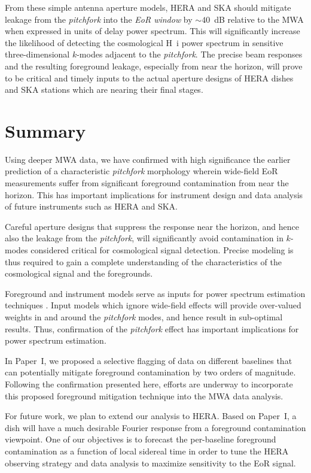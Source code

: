 \documentclass[preprint2,apjl,numberedappendix,twocolappendix,appendixfloats]{emulateapj}
\begin{document}
From these simple antenna aperture models, HERA and SKA should mitigate leakage from the {\it pitchfork} into the {\it EoR window} by $\sim 40$~dB relative to the MWA when expressed in units of delay power spectrum. This will significantly increase the likelihood of detecting the cosmological H~{\sc i} power spectrum in sensitive three-dimensional $k$-modes adjacent to the {\it pitchfork}. The precise beam responses and the resulting foreground leakage, especially from near the horizon, will prove to be critical and timely inputs to the actual aperture designs of HERA dishes and SKA stations which are nearing their final stages.

\section{Summary}\label{sec:summary}

Using deeper MWA data, we have confirmed with high significance the earlier prediction of a characteristic {\it pitchfork} morphology wherein wide-field EoR measurements suffer from significant foreground contamination from near the horizon. This has important implications for instrument design and data analysis of future instruments such as HERA and SKA. 

Careful aperture designs that suppress the response near the horizon, and hence also the leakage from the {\it pitchfork}, will significantly avoid contamination in $k$-modes considered critical for cosmological signal detection. Precise modeling is thus required to gain a complete understanding of the characteristics of the cosmological signal and the foregrounds. 

Foreground and instrument models serve as inputs for power spectrum estimation techniques \citep[for e.g.,][]{liu14a,liu14b,dil15}. Input models which ignore wide-field effects will provide over-valued weights in and around the {\it pitchfork} modes, and hence result in sub-optimal results. Thus, confirmation of the {\it pitchfork} effect has important implications for power spectrum estimation. 

In Paper~I, we proposed a selective flagging of data on different baselines that can potentially mitigate foreground contamination by two orders of magnitude. Following the confirmation presented here, efforts are underway to incorporate this proposed foreground mitigation technique into the MWA data analysis.

For future work, we plan to extend our analysis to HERA. Based on Paper~I, a dish will have a much desirable Fourier response from a foreground contamination viewpoint. One of our objectives is to forecast the per-baseline foreground contamination as a function of local sidereal time in order to tune the HERA observing strategy and data analysis to maximize sensitivity to the EoR signal.
\end{document}
